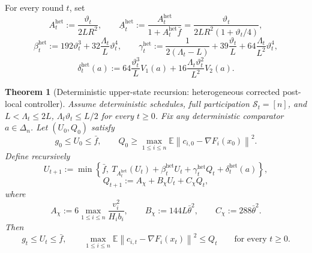 \documentclass{article}
\newtheorem{theorem}{Theorem}[section]
\theoremstyle{definition}
\newcommand{\EE}{\mathbb E}
\newcommand{\norm}[1]{\left\lVert #1\right\rVert}
\begin{document}
For every round $t$, set
\begin{equation}
A_t^{\mathrm{het}}:=\frac{\vartheta_t}{2LR^2},\qquad \underline A_t^{\mathrm{het}}:=\frac{A_t^{\mathrm{het}}}{1+A_t^{\mathrm{het}}\bar f}=\frac{\vartheta_t}{2LR^2(1+\vartheta_t/4)},
\label{eq:realized-het-A}\end{equation}
\[
\beta_t^{\mathrm{het}}:=192\vartheta_t^3+32\frac{\Lambda_t}{L}\vartheta_t^4,\qquad \gamma_t^{\mathrm{het}}:=\frac{1}{2(\Lambda_t-L)}+39\frac{\vartheta_t}{L}+64\frac{\Lambda_t}{L^2}\vartheta_t^4,
\]
\[
\delta_t^{\mathrm{het}}(a):=64\frac{\vartheta_t^3}{L}V_1(a)+16\frac{\Lambda_t\vartheta_t^2}{L^2}V_2(a).
\]
\begin{theorem}[Deterministic upper-state recursion: heterogeneous corrected post-local controller]
\label{th:realized-het-global}
Assume deterministic schedules, full participation $\mathcal S_t=[n]$, and $L<\Lambda_t\le 2L$, $\Lambda_t\vartheta_t\le L/2$ for every $t\ge 0$. Fix any deterministic comparator $a\in\Delta_n$. Let $(U_0,Q_0)$ satisfy
\begin{equation}
g_0\le U_0\le \bar f,
\qquad
Q_0\ge \max_{1\le i\le n}\EE\norm{c_{i,0}-\nabla F_i(x_0)}^2.
\label{eq:realized-het-init}\end{equation}
Define recursively
\begin{equation}
U_{t+1}
:=
\min\!\left\{
\bar f,\
T_{A_t^{\mathrm{het}}}(U_t)
+
\beta_t^{\mathrm{het}}U_t
+
\gamma_t^{\mathrm{het}}Q_t
+
\delta_t^{\mathrm{het}}(a)
\right\},
\label{eq:realized-het-U}\end{equation}
\begin{equation}
Q_{t+1}
:=
A_\chi+B_\chi U_t+C_\chi Q_t,
\label{eq:realized-het-Q}\end{equation}
where
\begin{equation}
A_\chi:=6\max_{1\le i\le n}\frac{v_i^2}{H_i b_i},
\qquad
B_\chi:=144L\bar\theta^2,
\qquad
C_\chi:=288\bar\theta^2.
\label{eq:realized-het-tracking-coeff}\end{equation}
Then
\begin{equation}
g_t\le U_t\le \bar f,
\qquad
\max_{1\le i\le n}\EE\norm{c_{i,t}-\nabla F_i(x_t)}^2\le Q_t
\qquad
\text{for every }t\ge 0.
\label{eq:realized-het-upper-state}\end{equation}
\end{theorem}
\end{document}
